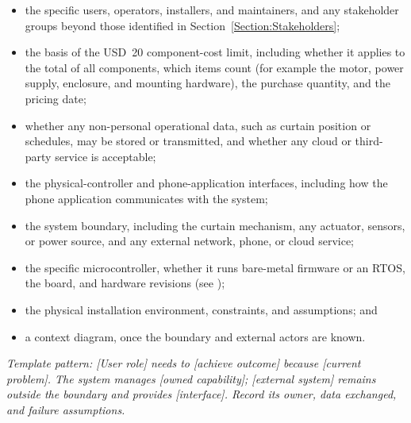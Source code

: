 \begin{itemize}
\item the specific users, operators, installers, and maintainers, and any
stakeholder groups beyond those identified in
Section~\ref{Section:Stakeholders};
\item the basis of the USD~20 component-cost limit, including whether it
applies to the total of all components, which items count (for example the
motor, power supply, enclosure, and mounting hardware), the purchase quantity,
and the pricing date;
\item whether any non-personal operational data, such as curtain position or
schedules, may be stored or transmitted, and whether any cloud or
third-party service is acceptable;
\item the physical-controller and phone-application interfaces, including
how the phone application communicates with the system;
\item the system boundary, including the curtain mechanism, any actuator,
sensors, or power source, and any external network, phone, or cloud service;
\item the specific microcontroller, whether it runs bare-metal firmware or
an RTOS, the board, and hardware revisions (see
);
\item the physical installation environment, constraints, and assumptions;
and
\item a context diagram, once the boundary and external actors are known.
\end{itemize}

\textit{Template pattern: [User role] needs to [achieve outcome] because
[current problem]. The system manages [owned capability]; [external system]
remains outside the boundary and provides [interface]. Record its owner, data
exchanged, and failure assumptions.}
